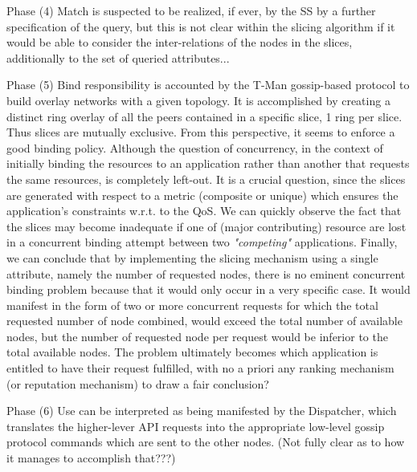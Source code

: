\documentclass[11pt]{amsart}
\begin{document}
        
        Phase (4) {Match} is suspected to be realized, if ever, by the SS by a further
        specification of the query, but this is not clear within the slicing algorithm
        if it would be able to consider the inter-relations of the nodes in the slices,
        additionally to the set of queried attributes... 

        Phase (5) {Bind} responsibility is accounted by the T-Man gossip-based protocol to
        build overlay networks with a given topology. It is accomplished by creating a
        distinct ring overlay of all the peers contained in a specific slice, 1 ring per
        slice. Thus slices are mutually exclusive. From this perspective, it seems to
        enforce a good binding policy. Although the question of concurrency, in the context
        of initially binding the resources to an application rather than another that
        requests the same resources, is completely left-out. It is a crucial question,
        since the slices are generated with respect to a metric (composite or unique)
        which ensures the application's constraints w.r.t. to the QoS. We can quickly
        observe the fact that the slices may become inadequate if one of (major
        contributing) resource are lost in a concurrent binding attempt between two
        \emph{"competing"} applications. Finally, we can conclude that by implementing the
        slicing mechanism using a single attribute, namely the number of requested nodes,
        there is no eminent concurrent binding problem because that it would only occur
        in a very specific case. It would manifest in the form of two or more concurrent
        requests for which the total requested number of node combined, would exceed the
        total number of available nodes, but the number of requested node per request
        would be inferior to the total available nodes. The problem ultimately becomes
        which application is entitled to have their request fulfilled, with no a priori
        any ranking mechanism (or reputation mechanism) to draw a fair conclusion?

        Phase (6) {Use} can be interpreted as being manifested by the Dispatcher, which
        translates the higher-lever API requests into the appropriate low-level gossip
        protocol commands which are sent to the other nodes. (Not fully clear as to how it
        manages to accomplish that???)
\end{document}
